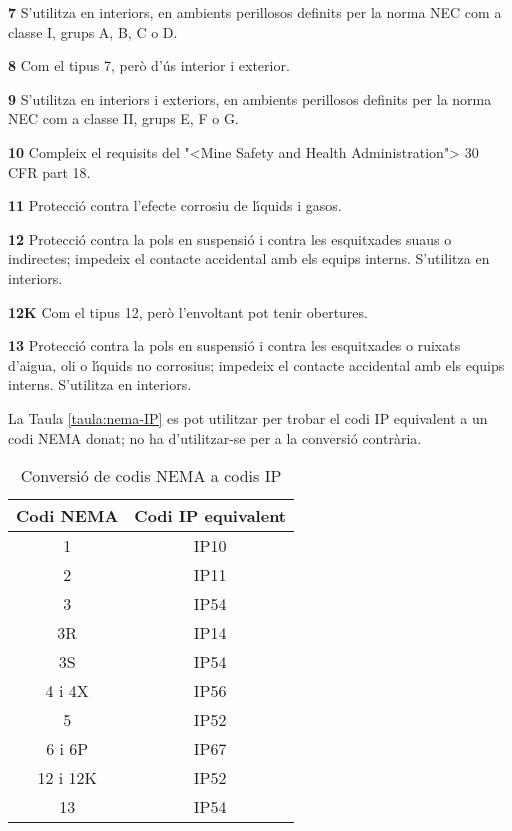 \begin{list}{}
   \item[\textbf{7}] S'utilitza en interiors, en ambients perillosos definits per la norma \textsf{NEC} com a classe I, grups A, B, C o D.
   \item[\textbf{8}] Com el tipus 7, per\`{o} d'\'{u}s interior i exterior.
   \item[\textbf{9}] S'utilitza en interiors i exteriors, en ambients perillosos definits per la norma \textsf{NEC} com a classe II, grups E, F o G.
   \item[\textbf{10}] Compleix el requisits del {"<}Mine Safety and Health Administration{">} 30 CFR part 18.
   \item[\textbf{11}] Protecci\'{o} contra l'efecte corrosiu de l\'{\i}quids i gasos.
   \item[\textbf{12}] Protecci\'{o} contra la pols en suspensi\'{o} i contra les esquitxades suaus o indirectes; impedeix el contacte accidental amb els equips interns. S'utilitza en interiors.
   \item[\textbf{12K}] Com el tipus 12, per\`{o} l'envoltant pot tenir obertures.
   \item[\textbf{13}] Protecci\'{o} contra la pols en suspensi\'{o} i contra les esquitxades o ruixats d'aigua, oli o l\'{\i}quids no corrosius; impedeix el contacte accidental amb els equips interns. S'utilitza en interiors.
\end{list}

\pagebreak La Taula \vref{taula:nema-IP} es pot utilitzar per trobar el codi \textsf{IP} equivalent a un codi \textsf{NEMA} donat; no ha d'utilitzar-se per a la conversi\'{o} contr\`{a}ria.
\begin{table}[htb]
   \caption{\label{taula:nema-IP} Conversi\'{o} de codis \textsf{NEMA} a codis \textsf{IP}}
   \begin{center}\begin{tabular}{cc}
   \toprule[1pt]
   Codi \textsf{NEMA} & Codi \textsf{IP} equivalent \\
   \midrule
   1 & \textsf{IP}10 \\
   2 & \textsf{IP}11 \\
   3 & \textsf{IP}54 \\
   3R & \textsf{IP}14 \\
   3S & \textsf{IP}54 \\
   4 i 4X & \textsf{IP}56 \\
   5 & \textsf{IP}52 \\
   6 i 6P & \textsf{IP}67\\
   12 i 12K & \textsf{IP}52 \\
   13 & \textsf{IP}54 \\
   \bottomrule[1pt]
   \end{tabular} \end{center}
\end{table}



